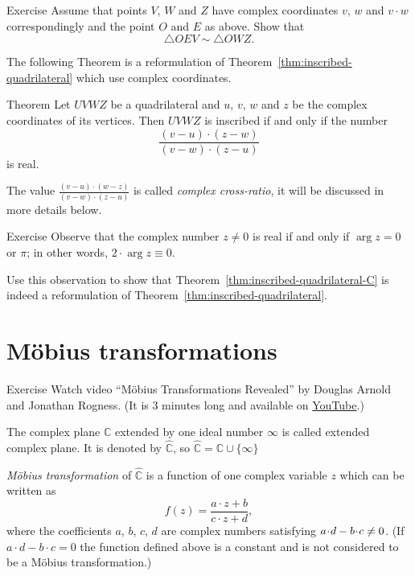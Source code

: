 \begin{thm}{Exercise}\label{ex:C-sim}
Assume that points $V$, $W$ and $Z$ have complex coordinates $v$, $w$ and $v\cdot w$ correspondingly and the point $O$ and $E$ as above.
Show that $$\triangle OEV\sim \triangle OWZ.$$

\end{thm}


The following Theorem is a reformulation of Theorem~\ref{thm:inscribed-quadrilateral} which use complex coordinates.


\begin{thm}{Theorem}\label{thm:inscribed-quadrilateral-C}
Let $UVWZ$ be a quadrilateral and $u$, $v$, $w$ and $z$ be the complex coordinates of its vertices. 
Then $UVWZ$ is inscribed 
if and only if the number
$$\frac{(v-u)\cdot(z-w)}{(v-w)\cdot(z-u)}$$ 
is real.
\end{thm}

The value $\frac{(v-u)\cdot(w-z)}{(v-w)\cdot(z-u)}$ is called 
\emph{complex cross-ratio}, it will be discussed in more details below.


\begin{thm}{Exercise}\label{ex:real-cross-ratio}
Observe that the complex number $z\ne 0$ is real if and only if $\arg z=0$ or $\pi$;
in other words, $2\cdot\arg z\equiv 0$.

Use this observation to show that Theorem~\ref{thm:inscribed-quadrilateral-C}
is indeed a reformulation of  Theorem~\ref{thm:inscribed-quadrilateral}.
\end{thm}



\section*{M\"obius transformations}

\begin{thm}{Exercise}\label{ex:movie}
Watch video ``M\"obius Transformations Revealed'' by Douglas Arnold and Jonathan Rogness.
(It is 3 minutes long and available on \href{http://youtu.be/0z1fIsUNhO4}{YouTube}.)
\end{thm}


The complex plane $\mathbb{C}$ extended by one ideal number $\infty$ 
is called  extended complex plane.
It is denoted by $\hat{\mathbb{C}}$, so $\hat{\mathbb{C}}=\mathbb{C}\cup\{\infty\}$

\emph{M\"obius transformation} of  $\hat{\mathbb{C}}$ is a function of one complex variable $z$
which can be written as
$$f(z) = \frac{a\cdot z + b}{c\cdot z + d},$$
where the coefficients $a$, $b$, $c$, $d$ are complex numbers satisfying $a\cdot d \z- b\cdot c \not= 0$.
(If $a\cdot d - b\cdot c = 0$ the function defined above is a constant and is not considered to be a M\"obius transformation.) 

